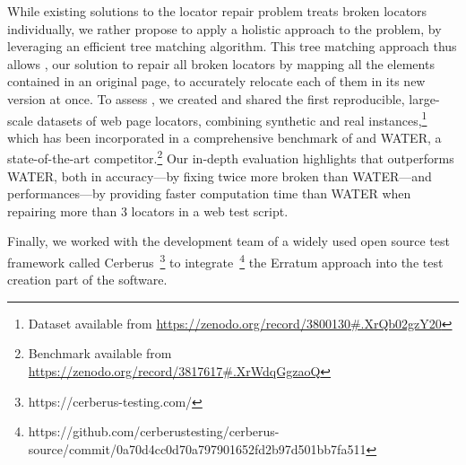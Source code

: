 While existing solutions to the locator repair problem treats broken locators individually, we rather propose to apply a holistic approach to the problem, by leveraging an efficient tree matching algorithm.
This tree matching approach thus allows \erratum{}, our solution to repair all broken locators by mapping all the elements contained in an original page, to accurately relocate each of them in its new version at once.
% 
To assess \erratum{}, we created and shared the first reproducible, large-scale datasets of web page locators, combining synthetic and real instances,\footnote{Dataset available from \url{https://zenodo.org/record/3800130\#.XrQb02gzY20}} which has been incorporated in a comprehensive benchmark of \erratum{} and WATER, a state-of-the-art competitor.\footnote{Benchmark available from \url{https://zenodo.org/record/3817617\#.XrWdqGgzaoQ}}
%
Our in-depth evaluation highlights that \erratum{} outperforms WATER, both in accuracy---by fixing twice more broken than WATER---and performances---by providing faster computation time than WATER when repairing more than 3 locators in a web test script.

Finally, we worked with the development team of a widely used open source test framework called Cerberus~\footnote{https://cerberus-testing.com/} to integrate~\footnote{https://github.com/cerberustesting/cerberus-source/commit/0a70d4cc0d70a797901652fd2b97d501bb7fa511} the Erratum approach into the test creation part of the software.

